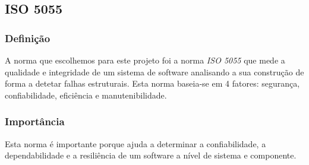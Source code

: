 \documentclass[a4paper,12pt]{article} %
\begin{document}
\subsection{ISO 5055}
\subsubsection{Definição}
A norma que escolhemos para este projeto foi a norma \textit{ISO 5055} que mede a qualidade e integridade de um sistema de software analisando a sua construção de forma a detetar falhas estruturais. Esta norma baseia-se em 4 fatores: segurança, confiabilidade, eficiência e manutenibilidade.

\subsubsection{Importância}
Esta norma é importante porque ajuda a determinar a confiabilidade, a dependabilidade e a resiliência de um software a nível de sistema e componente.

\newpage
\end{document}
